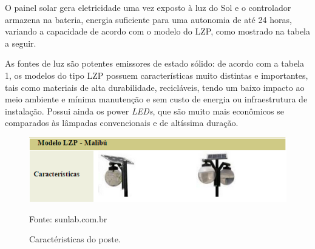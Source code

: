 \begin{itemize}
	O painel solar gera eletricidade uma vez exposto à luz do Sol e o controlador armazena na bateria, energia suficiente para uma autonomia de até 24 horas, variando a capacidade de acordo com o modelo do LZP, como mostrado na tabela a seguir.
	
	As fontes de luz são potentes emissores de estado sólido:  de acordo com a tabela 1, os modelos do tipo LZP possuem características muito distintas e importantes, tais como  materiais de alta durabilidade, recicláveis, tendo um baixo impacto ao meio ambiente e mínima manutenção e sem custo de energia ou infraestrutura de instalação.  	Possui ainda os power \textit{LEDs}, que são muito mais econômicos se comparados às lâmpadas convencionais e de altíssima duração.
\end{itemize}

	\begin{figure}[H]
	 \centering
	\label{Caractéristicas do poste}
	 \includegraphics[keepaspectratio=true,scale=0.8]{postes/tabelaLZP.png}
	 \caption{Caractéristicas do poste.}
	 \small{Fonte: sunlab.com.br}
	\end{figure}


